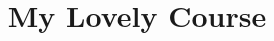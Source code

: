 \documentclass{xourse}
\title{My Lovely Course}
\begin{document}
\begin{abstract}
\end{abstract}
\maketitle
{}
\end{document}
